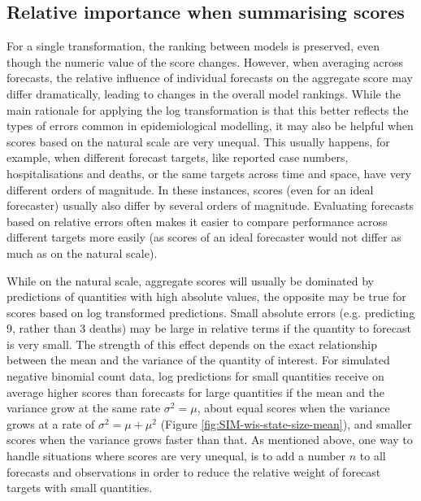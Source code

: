 \documentclass{article}
\begin{document}
\subsection{Relative importance when summarising scores}
For a single transformation, the ranking between models is preserved, even though the numeric value of the score changes. However, when averaging across forecasts, the relative influence of individual forecasts on the aggregate score may differ dramatically, leading to changes in the overall model rankings. While the main rationale for applying the log transformation is that this better reflects the types of errors common in epidemiological modelling, it may also be helpful when scores based on the natural scale are very unequal. This usually happens, for example, when different forecast targets, like reported case numbers, hospitalisations and deaths, or the same targets across time and space, have very different orders of magnitude. In these instances, scores (even for an ideal forecaster) usually also differ by several orders of magnitude. Evaluating forecasts based on relative errors often makes it easier to compare performance across different targets more easily (as scores of an ideal forecaster would not differ as much as on the natural scale). 

While on the natural scale, aggregate scores will usually be dominated by predictions of quantities with high absolute values, the opposite may be true for scores based on log transformed predictions. Small absolute errors (e.g. predicting 9, rather than 3 deaths) may be large in relative terms if the quantity to forecast is very small. The strength of this effect depends on the exact relationship between the mean and the variance of the quantity of interest. For simulated negative binomial count data, log predictions for small quantities receive on average higher scores than forecasts for large quantities if the mean and the variance grow at the same rate $\sigma^2 = \mu$, about equal scores when the variance grows at a rate of $\sigma^2 = \mu + \mu^2$ (Figure \ref{fig:SIM-wis-state-size-mean}), and smaller scores when the variance grows faster than that. As mentioned above, one way to handle situations where scores are very unequal, is to add a number $n$ to all forecasts and observations in order to reduce the relative weight of forecast targets with small quantities. 
\end{document}
